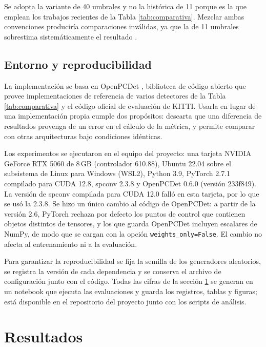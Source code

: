 \documentclass[11pt,letterpaper]{article}
\begin{document}
Se adopta la variante de 40 umbrales y no la histórica de 11 porque es la que emplean los trabajos recientes de la Tabla \ref{tab:comparativa}. Mezclar ambas convenciones produciría comparaciones inválidas, ya que la de 11 umbrales sobrestima sistemáticamente el resultado \cite{simonelli2019}.

\subsection{Entorno y reproducibilidad}

La implementación se basa en OpenPCDet \cite{openpcdet}, biblioteca de código abierto que provee implementaciones de referencia de varios detectores de la Tabla \ref{tab:comparativa} y el código oficial de evaluación de KITTI. Usarla en lugar de una implementación propia cumple dos propósitos: descarta que una diferencia de resultados provenga de un error en el cálculo de la métrica, y permite comparar con otras arquitecturas bajo condiciones idénticas.

Los experimentos se ejecutaron en el equipo del proyecto: una tarjeta NVIDIA GeForce RTX 5060 de 8\,GB (controlador 610.88), Ubuntu 22.04 sobre el subsistema de Linux para Windows (WSL2), Python 3.9, PyTorch 2.7.1 compilado para CUDA 12.8, spconv 2.3.8 y OpenPCDet 0.6.0 (versión 233f849). La versión de spconv compilada para CUDA 12.0 falló en esta tarjeta, por lo que se usó la 2.3.8. Se hizo un único cambio al código de OpenPCDet: a partir de la versión 2.6, PyTorch rechaza por defecto los puntos de control que contienen objetos distintos de tensores, y los que guarda OpenPCDet incluyen escalares de NumPy, de modo que se cargan con la opción \texttt{weights\_only=False}. El cambio no afecta al entrenamiento ni a la evaluación.

Para garantizar la reproducibilidad se fija la semilla de los generadores aleatorios, se registra la versión de cada dependencia y se conserva el archivo de configuración junto con el código. Todas las cifras de la sección \ref{sec:resultados} se generan en un notebook que ejecuta las evaluaciones y guarda los registros, tablas y figuras; está disponible en el repositorio del proyecto junto con los scripts de análisis.

\section{Resultados}
\label{sec:resultados}
\end{document}
